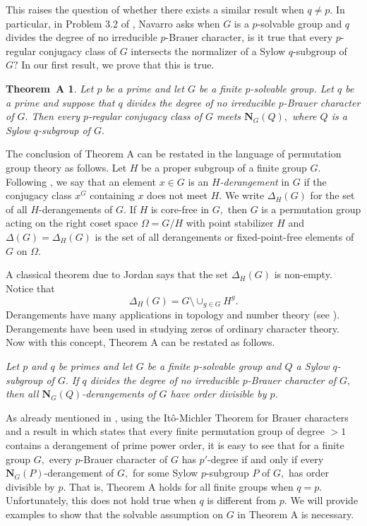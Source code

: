 \documentclass[12pt]{amsart}
\newtheorem*{thmA}{Theorem~A}
\theoremstyle{remark}
\numberwithin{equation}{section}
\begin{document}
This raises the question of whether there exists a similar result when $q\ne p$.  In particular, in Problem 3.2 of \cite{N1}, Navarro asks when $G$ is a $p$-solvable group and $q$ divides the degree of no irreducible $p$-Brauer character, is it true that every $p$-regular conjugacy class of $G$ intersects the normalizer of a Sylow $q$-subgroup of $G?$  In our first result, we prove that this is true.

\begin{thmA}\label{th:main1}
Let $p$ be a prime and let $G$ be a finite $p$-solvable group. Let $q$ be a prime and suppose that $q$ divides the degree of no irreducible $p$-Brauer character of $G.$ Then every $p$-regular conjugacy class of $G$ meets ${\mathbf{N}}_G (Q),$ where $Q$ is a Sylow $q$-subgroup of $G.$
\end{thmA}

The conclusion of Theorem A can be restated in the language of permutation group theory as follows. Let $H$ be a proper subgroup of a finite group $G.$ Following \cite{IKLM}, we say that an element $x\in G$ is an \emph{$H$-derangement} in $G$ if the conjugacy class $x^G$ containing $x$ does not meet $H.$ We write $\Delta_H(G)$ for the set of all $H$-derangements of $G.$ If $H$ is core-free in $G,$ then $G$ is a permutation group acting on the right coset space $\Omega=G/H$ with point stabilizer $H$ and $\Delta(G)=\Delta_H(G)$ is the set of all derangements or fixed-point-free elements of $G$ on $\Omega.$

A classical theorem due to Jordan \cite{Jordan} says that the set $\Delta_H(G)$ is non-empty. Notice that $$\Delta_H(G)=G\setminus \cup_{g\in G}H^g.$$  Derangements have many applications in topology and number theory (see \cite{Serre}). Derangements have been used in studying zeros of ordinary character theory. Now with this concept, Theorem A can be restated as follows.

\medskip
\emph{Let $p$ and $q$ be primes and let $G$ be a  finite $p$-solvable group and $Q$ a Sylow $q$-subgroup of $G.$ If $q$ divides the degree of no irreducible $p$-Brauer character of $G,$ then all ${\mathbf{N}}_G(Q)$-derangements of $G$ have order divisible by $p$.}

\medskip
As already mentioned in \cite{N1}, using the It\^{o}-Michler Theorem for Brauer characters and a result in \cite{FKS} which states that every finite permutation group of degree $>1$ contains a derangement of prime power order, it is easy to see that for a finite group $G,$ every $p$-Brauer character of $G$ has $p'$-degree if and only if every ${\mathbf{N}}_G(P)$-derangement of $G,$ for some Sylow $p$-subgroup $P$ of $G,$ has order divisible by $p.$ That is, Theorem A holds for all finite groups when $q=p.$ Unfortunately, this does not hold true when $q$ is different from $p$.  We will provide examples to show that the solvable assumption on $G$ in Theorem A is necessary.
\end{document}
